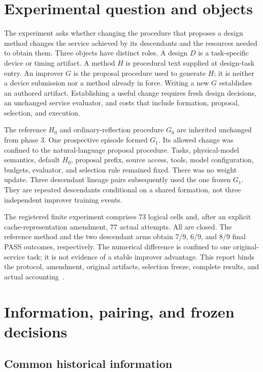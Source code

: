 \section{Experimental question and objects}

The experiment asks whether changing the procedure that proposes a design
method changes the service achieved by its descendants and the resources
needed to obtain them. Three objects have distinct roles. A design $D$ is a
task-specific device or timing artifact. A method $H$ is procedural text
supplied at design-task entry. An improver $G$ is the proposal procedure used
to generate $H$; it is neither a device submission nor a method already in
force. Writing a new $G$ establishes an authored artifact. Establishing a
useful change requires fresh design decisions, an unchanged service evaluator,
and costs that include formation, proposal, selection, and execution.

The reference $H_0$ and ordinary-reflection procedure $G_0$ are inherited
unchanged from phase 3. One prospective episode formed $G_1$. Its allowed
change was confined to the natural-language proposal procedure. Tasks,
physical-model semantics, default $H_0$, proposal prefix, source access, tools,
model configuration, budgets, evaluator, and selection rule remained fixed.
There was no weight update. Three descendant lineage pairs subsequently used
the one frozen $G_1$. They are repeated descendants conditional on a shared
formation, not three independent improver training events.

The registered finite experiment comprises 73 logical cells and, after an
explicit cache-representation amendment, 77 actual attempts. All are closed.
The reference method and the two descendant arms obtain 7/9, 6/9, and 8/9
final PASS outcomes, respectively. The numerical difference is confined to
one original-service task; it is not evidence of a stable improver advantage.
This report binds the protocol, amendment, original artifacts, selection
freeze, complete results, and actual accounting~\cite{protocol,results}.

\section{Information, pairing, and frozen decisions}

\subsection{Common historical information}

